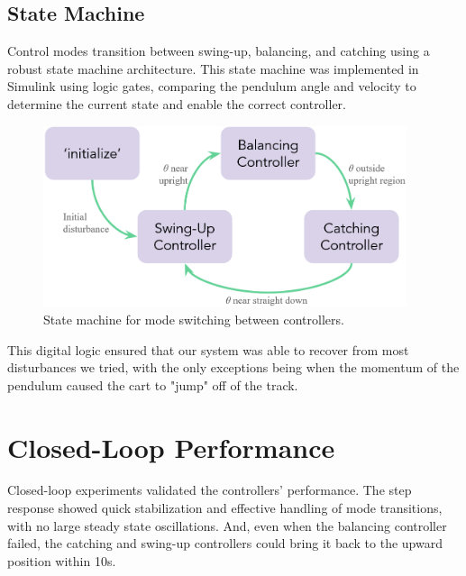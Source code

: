 \documentclass[12pt]{article}
\begin{document}
\subsection{State Machine}
Control modes transition between swing-up, balancing, and catching using a robust state machine architecture.
This state machine was implemented in Simulink using logic gates, comparing the pendulum angle and velocity to determine the current state and enable the correct controller.

\begin{figure}[H]
    \centering
    \includegraphics[width=0.95\textwidth]{figures/state_machine.png}
    \caption{State machine for mode switching between controllers.}
    \label{fig:state_machine}
\end{figure}

This digital logic ensured that our system was able to recover from most disturbances we tried, with the only exceptions being when the momentum of the pendulum caused the cart to "jump" off of the track.

\section{Closed-Loop Performance}

Closed-loop experiments validated the controllers' performance. The step response showed quick stabilization and effective handling of mode transitions, with no large steady state oscillations. And, even when the balancing controller failed, the catching and swing-up controllers could bring it back to the upward position within 10s. 
\end{document}
